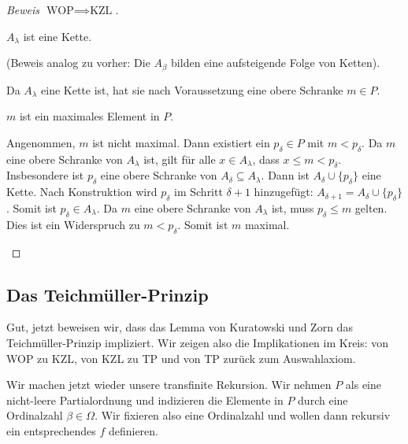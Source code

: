 \begin{proof}[Beweis $\text{WOP} \implies \text{KZL}$]
\begin{math-stroke}
\begin{claim}
$A_\lambda$ ist eine Kette.
\end{claim}
(Beweis analog zu vorher: Die $A_\beta$ bilden eine aufsteigende Folge von Ketten).

Da $A_\lambda$ eine Kette ist, hat sie nach Voraussetzung eine obere Schranke $m \in P$.

\begin{claim}
$m$ ist ein maximales Element in $P$.
\end{claim}
\begin{short-proof}
Angenommen, $m$ ist nicht maximal. Dann existiert ein $p_\delta \in P$ mit $m < p_\delta$.
Da $m$ eine obere Schranke von $A_\lambda$ ist, gilt für alle $x \in A_\lambda$, dass $x \le m < p_\delta$.
Insbesondere ist $p_\delta$ eine obere Schranke von $A_\delta \subseteq A_\lambda$.
Dann ist $A_\delta \cup \{p_\delta\}$ eine Kette.
Nach Konstruktion wird $p_\delta$ im Schritt $\delta+1$ hinzugefügt: $A_{\delta+1} = A_\delta \cup \{p_\delta\}$.
Somit ist $p_\delta \in A_\lambda$.
Da $m$ eine obere Schranke von $A_\lambda$ ist, muss $p_\delta \le m$ gelten.
Dies ist ein Widerspruch zu $m < p_\delta$.
Somit ist $m$ maximal.
\end{short-proof}
\end{math-stroke}
\end{proof}

\begin{ai-global-state-checkpoint-invisible-content}
\end{ai-global-state-checkpoint-invisible-content}

\subsection{Das Teichmüller-Prinzip}

\begin{spoken-clean}[00:56:45 - 00:58:30]
Gut, jetzt beweisen wir, dass das Lemma von Kuratowski und Zorn das Teichmüller-Prinzip impliziert. Wir zeigen also die Implikationen im Kreis: von WOP zu KZL, von KZL zu TP und von TP zurück zum Auswahlaxiom. 

Wir machen jetzt wieder unsere transfinite Rekursion. Wir nehmen $P$ als eine nicht-leere Partialordnung und indizieren die Elemente in $P$ durch eine Ordinalzahl $\beta \in \Omega$. Wir fixieren also eine Ordinalzahl und wollen dann rekursiv ein entsprechendes $f$ definieren.
\end{spoken-clean}

